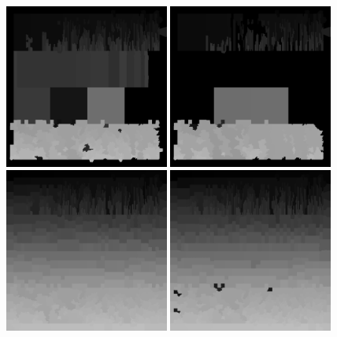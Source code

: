 \documentclass[
  12pt,
]{book}
\begin{document}
\begin{figure}

{\centering \includegraphics[width=0.48\textwidth]{../imgs/ncuts_5_2000_1.0_10_20} \includegraphics[width=0.48\textwidth]{../imgs/ncuts_5_2000_1.0_100_100} \includegraphics[width=0.48\textwidth]{../imgs/ncuts_5_2000_500.0_10_100} \includegraphics[width=0.48\textwidth]{../imgs/ncuts_5_2000_500.0_100_20} 

}
\end{figure}
\end{document}
